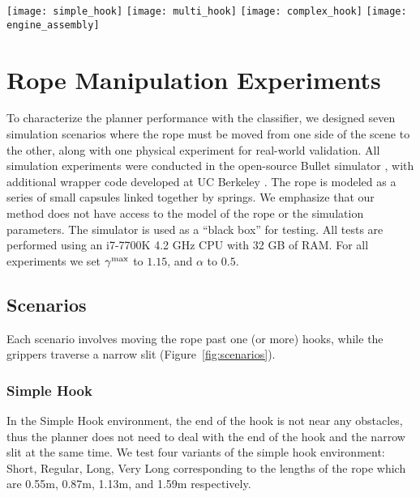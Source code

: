 \begin{figure*}[h]
    \centering
    \texttt{[image: simple\_hook]}\hfill
    \texttt{[image: multi\_hook]}\hfill
    \texttt{[image: complex\_hook]}\hfill
    \texttt{[image: engine\_assembly]}%
    \caption{The rope is shown in green, with the grippers shown in blue. The target area for the grippers is shown in red. Walls with narrow slits for the grippers are shown in purple. Hooks and other obstacles are shown in dark cyan. Left: Simple Hook; Center Left: Multi Hook; Center Right: Complex Hook; Right: Engine Assembly}
    \label{fig:scenarios}
\end{figure*}



\section{Rope Manipulation Experiments}

To characterize the planner performance with the classifier, we designed seven simulation scenarios where the rope must be moved from one side of the scene to the other, along with one physical experiment for real-world validation.
All simulation experiments were conducted in the open-source Bullet simulator \cite{Coumans2010}, with additional wrapper code developed at UC Berkeley \cite{ucberkley_bullet}. The rope is modeled as a series of small capsules linked together by springs. We emphasize that our method does not have access to the model of the rope or the simulation parameters. The simulator is used as a ``black box'' for testing. All tests are performed using an i7-7700K 4.2 GHz CPU with 32 GB of RAM. For all experiments we set $\gamma^{\textrm{max}}$ to $1.15$, and $\alpha$ to $0.5$.

\subsection{Scenarios}

Each scenario involves moving the rope past one (or more) hooks, while the grippers traverse a narrow slit (Figure~\ref{fig:scenarios}).

\subsubsection{Simple Hook}
In the Simple Hook environment, the end of the hook is not near any obstacles, thus the planner does not need to deal with the end of the hook and the narrow slit at the same time. We test four variants of the simple hook environment: Short, Regular, Long, Very Long corresponding to the lengths of the rope which are 0.55m, 0.87m, 1.13m, and 1.59m respectively.

